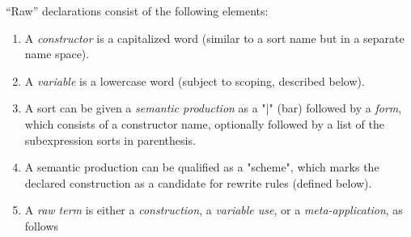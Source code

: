 \documentclass[12pt]{article} %
\begin{document}
\begin{manual}\label{man:raw}
  ``Raw'' declarations consist of the following elements:
  \begin{enumerate}

  \item A \emph{constructor} is a capitalized word (similar to a sort name but in a separate name
    space).

  \item A \emph{variable} is a lowercase word (subject to scoping, described below).

  \item A sort can be given a \emph{semantic production} as a "|" (bar) followed by a \emph{form},
    which consists of a constructor name, optionally followed by a list of the subexpression sorts
    in parenthesis.


  \item A semantic production can be qualified as a "scheme", which marks the declared construction
    as a candidate for rewrite rules (defined below).

  \item A \emph{raw term} is either a \emph{construction}, a \emph{variable use}, or a
    \emph{meta-application}, as follows
    \begin{enumerate}


\end{enumerate}
\end{enumerate}
\end{manual}
\end{document}
